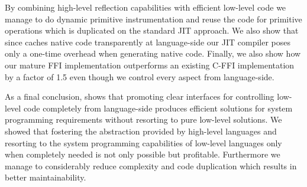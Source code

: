 By combining high-level reflection capabilities with efficient low-level code we manage to do dynamic primitive instrumentation and reuse the code for primitive operations which is duplicated on the standard JIT approach.
We also show that since \B caches native code transparently at language-side our JIT compiler poses only a one-time overhead when generating native code. 
Finally, we also show how our mature FFI implementation outperforms an existing C-FFI implementation by a factor of 1.5 even though we control every aspect from language-side.


As a final conclusion, \B shows that promoting clear interfaces for controlling low-level code completely from language-side produces efficient solutions for system programming requirements without resorting to pure low-level solutions.
We showed that fostering the abstraction provided by high-level languages and resorting to the system programming capabilities of low-level languages only when completely needed is not only possible but profitable.
Furthermore we manage to considerably reduce complexity and code duplication which results in better maintainability.



